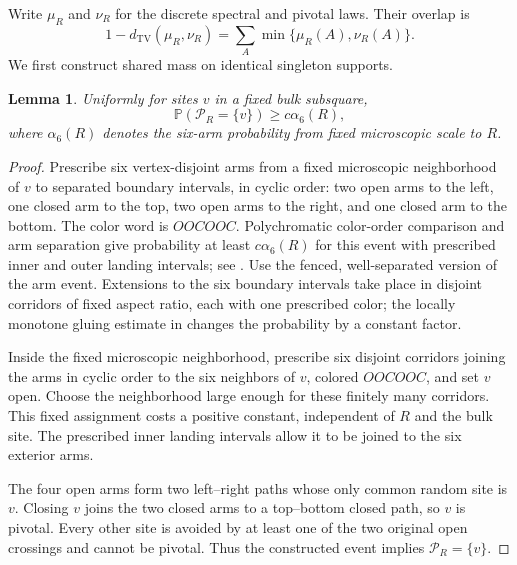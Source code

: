 \documentclass[11pt]{amsart}
\newtheorem{lemma}[theorem]{Lemma}
\theoremstyle{remark}
\newcommand{\Prob}{\mathbb P}
\newcommand{\cP}{\mathcal P}
\newcommand{\TV}{d_{\mathrm{TV}}}
\begin{document}
Write $\mu_R$ and $\nu_R$ for the discrete spectral and pivotal laws. Their overlap is
\begin{equation}\label{eq:overlap}
 1-\TV(\mu_R,\nu_R)=\sum_A\min\{\mu_R(A),\nu_R(A)\}.
\end{equation}
We first construct shared mass on identical singleton supports.

\begin{lemma}\label{lem:singlepiv}
Uniformly for sites $v$ in a fixed bulk subsquare,
\[
 \Prob(\cP_R=\{v\})\ge c\alpha_6(R),
\]
where $\alpha_6(R)$ denotes the six-arm probability from fixed microscopic scale to $R$.
\end{lemma}
\begin{proof}
Prescribe six vertex-disjoint arms from a fixed microscopic neighborhood of $v$ to separated boundary intervals, in cyclic order: two open arms to the left, one closed arm to the top, two open arms to the right, and one closed arm to the bottom. The color word is $OOCOOC$. Polychromatic color-order comparison and arm separation give probability at least $c\alpha_6(R)$ for this event with prescribed inner and outer landing intervals; see \cite[Theorem~11, equation~(4.8), Proposition~12, and Proposition~20, equation~(5.2)]{Nolin}. Use the fenced, well-separated version of the arm event. Extensions to the six boundary intervals take place in disjoint corridors of fixed aspect ratio, each with one prescribed color; the locally monotone gluing estimate in \cite[Proposition~12]{Nolin} changes the probability by a constant factor.

Inside the fixed microscopic neighborhood, prescribe six disjoint corridors joining the arms in cyclic order to the six neighbors of $v$, colored $OOCOOC$, and set $v$ open. Choose the neighborhood large enough for these finitely many corridors. This fixed assignment costs a positive constant, independent of $R$ and the bulk site. The prescribed inner landing intervals allow it to be joined to the six exterior arms.

The four open arms form two left--right paths whose only common random site is $v$. Closing $v$ joins the two closed arms to a top--bottom closed path, so $v$ is pivotal. Every other site is avoided by at least one of the two original open crossings and cannot be pivotal. Thus the constructed event implies $\cP_R=\{v\}$.
\end{proof}
\end{document}
